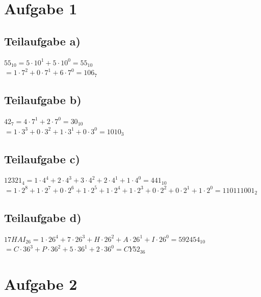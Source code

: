 \documentclass{llncs}
\begin{document}
\section*{Aufgabe 1}

\subsection*{Teilaufgabe a)}

$55_{10} = 5 \cdot 10^1 + 5 \cdot 10^0 = 55_{10}$\\
$= 1 \cdot 7^2 + 0 \cdot 7^1 + 6 \cdot 7^0 = 106_{7}$

\subsection*{Teilaufgabe b)}

$42_{7} = 4 \cdot 7^1 + 2 \cdot 7^0 = 30_{10}$\\
$= 1 \cdot 3^3 + 0 \cdot 3^2 + 1 \cdot 3^1 + 0 \cdot 3^0 = 1010_{3}$

\subsection*{Teilaufgabe c)}

$12321_{4} = 1 \cdot 4^4 + 2 \cdot 4^3 + 3 \cdot 4^2 + 2 \cdot 4^1 +1 \cdot 4^0 = 441_{10}$\\
$= 1 \cdot 2^8 + 1 \cdot 2^7 + 0 \cdot 2^6 + 1 \cdot 2^5 + 1 \cdot 2^4 + 1 \cdot 2^3 + 0 \cdot 2^2 + 0 \cdot 2^1 + 1 \cdot 2^0 = 110111001_{2}$

\subsection*{Teilaufgabe d)}

$17HAI_{26} = 1 \cdot 26^4 + 7 \cdot 26^3 + H \cdot 26^2 + A \cdot 26^1 + I \cdot 26^0 = 592454_{10}$\\
$= C \cdot 36^3 + P \cdot 36^2 + 5 \cdot 36^1 + 2 \cdot 36^0 = CY52_{36}$

\section*{Aufgabe 2}
\end{document}
